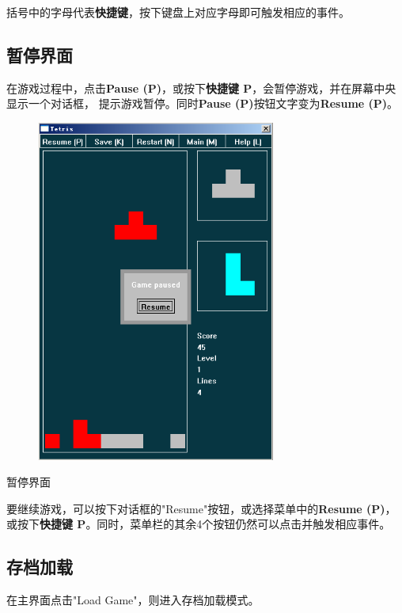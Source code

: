 \documentclass{style/ucasproposal}
\begin{document}
括号中的字母代表\textbf{快捷键}，按下键盘上对应字母即可触发相应的事件。

\subsection{暂停界面}
在游戏过程中，点击\textbf{Pause (P)}，或按下\textbf{快捷键 P}，会暂停游戏，并在屏幕中央显示一个对话框，
提示游戏暂停。同时\textbf{Pause (P)}按钮文字变为\textbf{Resume (P)}。
\begin{center}
\begin{figure}[H]
\center
    \includegraphics[width=0.7\textwidth]{./img/manual/3-pause.png}
\end{figure}
暂停界面
\end{center}

要继续游戏，可以按下对话框的"Resume"按钮，或选择菜单中的\textbf{Resume (P)}，
或按下\textbf{快捷键 P}。同时，菜单栏的其余4个按钮仍然可以点击并触发相应事件。

\subsection{存档加载}
在主界面点击"Load Game"，则进入存档加载模式。
\end{document}
